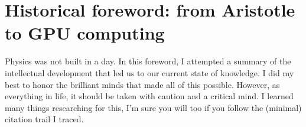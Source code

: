
%
%
%

\newpage

\chapter*{Historical foreword: from Aristotle to GPU computing}


Physics was not built in a day. In this foreword, I attempted a summary of the intellectual development that led us to our current state of knowledge. I did my best to honor the brilliant minds that made all of this possible. However, as everything in life, it should be taken with caution and a critical mind. I learned many things researching for this, I'm sure you will too if you follow the (minimal) citation trail I traced. 

